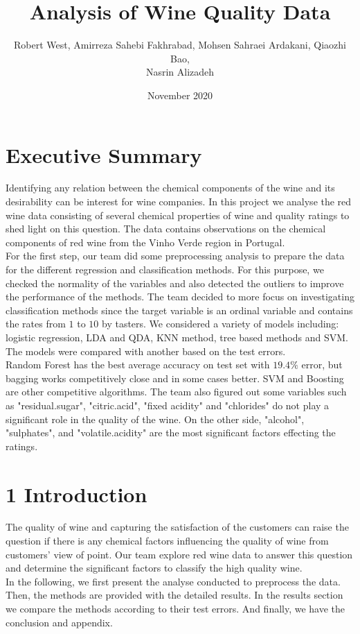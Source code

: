 \documentclass{article}
\title{Analysis of Wine Quality Data}
\author{Robert West, Amirreza Sahebi Fakhrabad, Mohsen Sahraei Ardakani, Qiaozhi Bao,  \\Nasrin Alizadeh}
\date{November 2020}
\begin{document}
\maketitle

\section*{Executive Summary}
Identifying any relation between the chemical components of the wine and its desirability can be interest for wine companies. In this project we analyse the red wine data consisting of several chemical properties of wine and quality ratings to shed light on this question. The data contains observations on the chemical components of red wine from the Vinho Verde region in Portugal. \\
For the first step, our team did some preprocessing analysis to prepare the data for the different regression and classification methods. For this purpose, we checked the normality of the variables and also detected the outliers to improve the performance of the methods. The team decided to more focus on investigating classification methods since the target variable is an ordinal variable and contains the rates from $1$ to $10$ by tasters. We considered a variety of models including: logistic regression, LDA and QDA, KNN method, tree based methods and SVM. The models were compared with another based on the test errors.  \\Random Forest has the best average accuracy on test set with $19.4\%$ error, but bagging works competitively close and in some cases better. SVM and Boosting are other competitive algorithms. The team also figured out some variables such as "residual.sugar", "citric.acid", "fixed acidity" and "chlorides" do not play a significant role in the quality of the wine. On the other side, "alcohol", "sulphates", and "volatile.acidity" are the most significant factors effecting the ratings.

\section{1  Introduction}
The quality of wine and capturing the satisfaction of the customers can raise the question if there is any chemical factors influencing the quality of wine from customers' view of point. Our team explore red wine data to answer this question and determine the significant factors to classify the high quality wine. \\In the following, we first present the analyse conducted to preprocess the data. Then, the methods are provided with the detailed results. In the results section we compare the methods according to their test errors. And finally, we have the conclusion and appendix.
\end{document}
